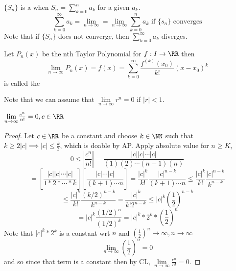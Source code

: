 \documentclass[12pt]{scrartcl}
\begin{document}
\begin{definition}
  $\{S_n\}$ is a  when $S_n = \sum_{k=0}^n a_k$ for a given $a_k$. 
  \[\sum_{k=0}^\infty a_k = \lim_{n\to\infty} = \lim_{n\to\infty} \sum_{k=0}^n a_k \text{ if } \{s_n\} \text{ converges}\]
  Note that if $\{S_n\}$ does not converge, then $\sum_{k=0}^\infty a_k$ diverges. 
\end{definition}

\begin{definition}
  Let $P_n(x)$ be the nth Taylor Polynomial for $f: I \to \RR$ then 
  \[\lim_{n\to\infty}P_n(x) = f(x) = \sum_{k=0}^\infty \frac{f^{(k)}(x_0)}{k!}(x-x_0)^k\]
  is called the 
\end{definition}

\begin{note}
  Note that we can assume that $\underset{n\to\infty}{\lim}r^n = 0$ if $|r| < 1$.
\end{note}

\begin{lemma}
  $\underset{n\to\infty}{\lim}\frac{c^n}{n!} = 0, c \in \RR$

  \begin{proof}
    Let $c \in \RR$ be a constant and choose $k \in \NN$ such that $k \geq 2|c| \implies |c| \leq \frac{k}{2}$, which is doable by AP.
    Apply absolute value for $n \geq K$, 
    \[0 \leq |\frac{c^n}{n!}| = \frac{|c||c| \cdots |c|}{(1)(2) \cdots (n-1)(n)}\] 
    \[= \left[ \frac{|c||c|\cdots|c|}{1 * 2 * \cdots * k} \right] \left[ \frac{|c|\cdots|c|}{(k+1)\cdots n}\right] = \frac{|c|^k}{k!}\frac{|c|^{n-k}}{(k+1)\cdots n} \leq \frac{|c|^k}{k!}\frac{|c|^{n-k}}{k^{n-k}}\]
    \[\leq \frac{|c|^k}{k!}\frac{(k/2)^{n-k}}{k^{n-k}} = \frac{|c|^k}{k! 2^{n-k}} \leq |c|^k (\frac{1}{2})^{n-k}\]
    \[= |c|^k \frac{(1/2)^n}{(1/2)^k} = |c|^k * 2^k * (\frac{1}{2})^n\]
    Note that $|c|^k * 2^k$ is a constant wrt $n$ and $(\frac{1}{2})^n \to \infty, n \to \infty$
    \[\lim_{n\to\infty}(\frac{1}{2})^n = 0\] and so since that term is a constant
    then by CL, $\underset{n\to\infty}{\lim}\frac{c^n}{n!} = 0$.
  \end{proof}
\end{lemma}
\end{document}
